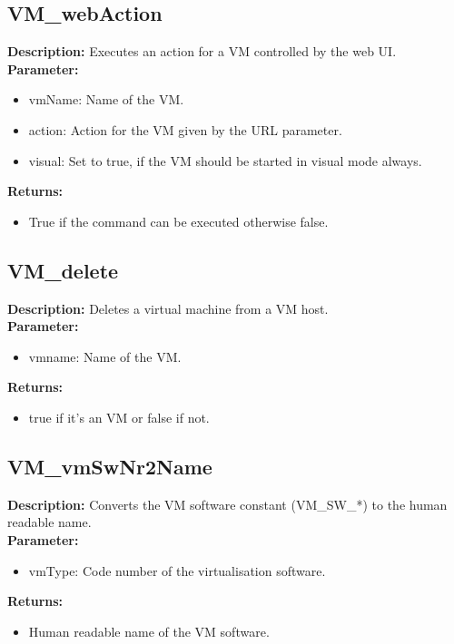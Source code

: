 \subsection{VM\_webAction}
\textbf{Description:} Executes an action for a VM controlled by the web UI.\\
\textbf{Parameter:}
\begin{itemize}
\item vmName: Name of the VM.
\item action: Action for the VM given by the URL parameter.
\item visual: Set to true, if the VM should be started in visual mode always.
\end{itemize}
\textbf{Returns:}
\begin{itemize}
\item True if the command can be executed otherwise false.
\end{itemize}

\subsection{VM\_delete}
\textbf{Description:} Deletes a virtual machine from a VM host.\\
\textbf{Parameter:}
\begin{itemize}
\item vmname: Name of the VM.
\end{itemize}
\textbf{Returns:}
\begin{itemize}
\item true if it's an VM or false if not.
\end{itemize}

\subsection{VM\_vmSwNr2Name}
\textbf{Description:} Converts the VM software constant (VM\_SW\_*) to the human readable name.\\
\textbf{Parameter:}
\begin{itemize}
\item vmType: Code number of the virtualisation software.
\end{itemize}
\textbf{Returns:}
\begin{itemize}
\item Human readable name of the VM software.
\end{itemize}

